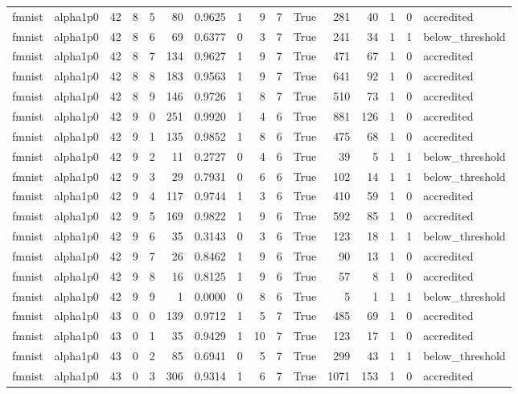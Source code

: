 \begin{tabular}{llrrrrrrrrrrrrrl}
fmnist & alpha1p0 & 42 & 8 & 5 & 80 & 0.9625 & 1 & 9 & 7 & True & 281 & 40 & 1 & 0 & accredited \\
fmnist & alpha1p0 & 42 & 8 & 6 & 69 & 0.6377 & 0 & 3 & 7 & True & 241 & 34 & 1 & 1 & below\_threshold \\
fmnist & alpha1p0 & 42 & 8 & 7 & 134 & 0.9627 & 1 & 9 & 7 & True & 471 & 67 & 1 & 0 & accredited \\
fmnist & alpha1p0 & 42 & 8 & 8 & 183 & 0.9563 & 1 & 9 & 7 & True & 641 & 92 & 1 & 0 & accredited \\
fmnist & alpha1p0 & 42 & 8 & 9 & 146 & 0.9726 & 1 & 8 & 7 & True & 510 & 73 & 1 & 0 & accredited \\
fmnist & alpha1p0 & 42 & 9 & 0 & 251 & 0.9920 & 1 & 4 & 6 & True & 881 & 126 & 1 & 0 & accredited \\
fmnist & alpha1p0 & 42 & 9 & 1 & 135 & 0.9852 & 1 & 8 & 6 & True & 475 & 68 & 1 & 0 & accredited \\
fmnist & alpha1p0 & 42 & 9 & 2 & 11 & 0.2727 & 0 & 4 & 6 & True & 39 & 5 & 1 & 1 & below\_threshold \\
fmnist & alpha1p0 & 42 & 9 & 3 & 29 & 0.7931 & 0 & 6 & 6 & True & 102 & 14 & 1 & 1 & below\_threshold \\
fmnist & alpha1p0 & 42 & 9 & 4 & 117 & 0.9744 & 1 & 3 & 6 & True & 410 & 59 & 1 & 0 & accredited \\
fmnist & alpha1p0 & 42 & 9 & 5 & 169 & 0.9822 & 1 & 9 & 6 & True & 592 & 85 & 1 & 0 & accredited \\
fmnist & alpha1p0 & 42 & 9 & 6 & 35 & 0.3143 & 0 & 3 & 6 & True & 123 & 18 & 1 & 1 & below\_threshold \\
fmnist & alpha1p0 & 42 & 9 & 7 & 26 & 0.8462 & 1 & 9 & 6 & True & 90 & 13 & 1 & 0 & accredited \\
fmnist & alpha1p0 & 42 & 9 & 8 & 16 & 0.8125 & 1 & 9 & 6 & True & 57 & 8 & 1 & 0 & accredited \\
fmnist & alpha1p0 & 42 & 9 & 9 & 1 & 0.0000 & 0 & 8 & 6 & True & 5 & 1 & 1 & 1 & below\_threshold \\
fmnist & alpha1p0 & 43 & 0 & 0 & 139 & 0.9712 & 1 & 5 & 7 & True & 485 & 69 & 1 & 0 & accredited \\
fmnist & alpha1p0 & 43 & 0 & 1 & 35 & 0.9429 & 1 & 10 & 7 & True & 123 & 17 & 1 & 0 & accredited \\
fmnist & alpha1p0 & 43 & 0 & 2 & 85 & 0.6941 & 0 & 5 & 7 & True & 299 & 43 & 1 & 1 & below\_threshold \\
fmnist & alpha1p0 & 43 & 0 & 3 & 306 & 0.9314 & 1 & 6 & 7 & True & 1071 & 153 & 1 & 0 & accredited \\

\end{tabular}
